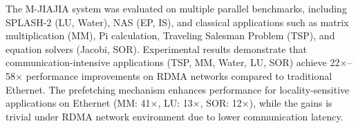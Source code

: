The M-JIAJIA system was evaluated on multiple parallel benchmarks, including SPLASH-2 (LU, Water), NAS (EP, IS), and classical applications such as matrix multiplication (MM), Pi calculation, Traveling Salesman Problem (TSP), and equation solvers (Jacobi, SOR). Experimental results demonstrate that communication-intensive applications (TSP, MM, Water, LU, SOR) achieve 22×–58× performance improvements on RDMA networks compared to traditional Ethernet. The prefetching mechanism enhances performance for locality-sensitive applications on Ethernet (MM: 41×, LU: 13×, SOR: 12×), while the gains is trivial under RDMA network environment due to lower communication latency. 



\pagestyle{enfrontmatterstyle}%
\cleardoublepage\pagestyle{frontmatterstyle}%


